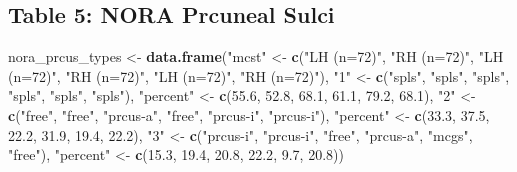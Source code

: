 \documentclass[
]{article}
\newenvironment{Shaded}{\begin{snugshade}}{\end{snugshade}}
\newcommand{\FloatTok}[1]{\textcolor[rgb]{0.00,0.00,0.81}{#1}}
\newcommand{\KeywordTok}[1]{\textcolor[rgb]{0.13,0.29,0.53}{\textbf{#1}}}
\newcommand{\NormalTok}[1]{#1}
\newcommand{\StringTok}[1]{\textcolor[rgb]{0.31,0.60,0.02}{#1}}
\begin{document}
\hypertarget{table-5-nora-prcuneal-sulci}{%
\subsection{Table 5: NORA Prcuneal
Sulci}\label{table-5-nora-prcuneal-sulci}}

\begin{Shaded}
\begin{Highlighting}[]
\NormalTok{nora_prcus_types <-}\StringTok{ }\KeywordTok{data.frame}\NormalTok{(}\StringTok{"mcst"}\NormalTok{ <-}\StringTok{ }\KeywordTok{c}\NormalTok{(}\StringTok{"LH (n=72)"}\NormalTok{, }\StringTok{"RH (n=72)"}\NormalTok{, }\StringTok{"LH (n=72)"}\NormalTok{, }\StringTok{"RH (n=72)"}\NormalTok{, }\StringTok{"LH (n=72)"}\NormalTok{, }\StringTok{"RH (n=72)"}\NormalTok{),}
                              \StringTok{"1"}\NormalTok{ <-}\StringTok{ }\KeywordTok{c}\NormalTok{(}\StringTok{"spls"}\NormalTok{, }\StringTok{"spls"}\NormalTok{,    }\StringTok{"spls"}\NormalTok{, }\StringTok{"spls"}\NormalTok{,    }\StringTok{"spls"}\NormalTok{, }\StringTok{"spls"}\NormalTok{),}
                              \StringTok{"percent"}\NormalTok{ <-}\StringTok{ }\KeywordTok{c}\NormalTok{(}\FloatTok{55.6}\NormalTok{, }\FloatTok{52.8}\NormalTok{,   }\FloatTok{68.1}\NormalTok{, }\FloatTok{61.1}\NormalTok{,        }\FloatTok{79.2}\NormalTok{, }\FloatTok{68.1}\NormalTok{),}
                              \StringTok{"2"}\NormalTok{ <-}\StringTok{ }\KeywordTok{c}\NormalTok{(}\StringTok{"free"}\NormalTok{, }\StringTok{"free"}\NormalTok{,    }\StringTok{"prcus-a"}\NormalTok{, }\StringTok{"free"}\NormalTok{,    }\StringTok{"prcus-i"}\NormalTok{, }\StringTok{"prcus-i"}\NormalTok{),}
                              \StringTok{"percent"}\NormalTok{ <-}\StringTok{ }\KeywordTok{c}\NormalTok{(}\FloatTok{33.3}\NormalTok{, }\FloatTok{37.5}\NormalTok{,   }\FloatTok{22.2}\NormalTok{, }\FloatTok{31.9}\NormalTok{,           }\FloatTok{19.4}\NormalTok{, }\FloatTok{22.2}\NormalTok{),}
                              \StringTok{"3"}\NormalTok{ <-}\StringTok{ }\KeywordTok{c}\NormalTok{(}\StringTok{"prcus-i"}\NormalTok{, }\StringTok{"prcus-i"}\NormalTok{, }\StringTok{"free"}\NormalTok{, }\StringTok{"prcus-a"}\NormalTok{,    }\StringTok{"mcgs"}\NormalTok{, }\StringTok{"free"}\NormalTok{),}
                              \StringTok{"percent"}\NormalTok{ <-}\StringTok{ }\KeywordTok{c}\NormalTok{(}\FloatTok{15.3}\NormalTok{, }\FloatTok{19.4}\NormalTok{,        }\FloatTok{20.8}\NormalTok{, }\FloatTok{22.2}\NormalTok{,           }\FloatTok{9.7}\NormalTok{, }\FloatTok{20.8}\NormalTok{))}


\end{Highlighting}
\end{Shaded}
\end{document}
